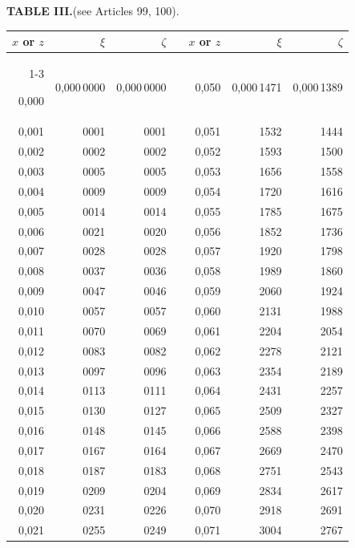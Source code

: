 \clearpage
{}
\begingroup
\centering
\fontsize{9}{9}\selectfont
\setlength{\tabcolsep}{8pt}
\renewcommand{\arraystretch}{1}
\setlength{\parskip}{0pt}
\textbf{TABLE III.}\quad (see Articles 99, 100).
\par\vspace{7pt}
\begin{tabular}{|r|r|r|@{}p{9pt}@{}|r|r|r|}
\hline
\rule{0pt}{8.5pt}\(x\) or \(z\) & \(\xi\) & \(\zeta\) & & \(x\) or \(z\) & \(\xi\) & \(\zeta\) \\
\cline{1-3}\cline{5-7}
\rule{0pt}{8.5pt}0,000 & 0,000\,0000 & 0,000\,0000 &  & 0,050 & 0,000\,1471 & 0,000\,1389 \\
0,001 & 0001 & 0001 &  & 0,051 & 1532 & 1444 \\
0,002 & 0002 & 0002 &  & 0,052 & 1593 & 1500 \\
0,003 & 0005 & 0005 &  & 0,053 & 1656 & 1558 \\
0,004 & 0009 & 0009 &  & 0,054 & 1720 & 1616 \\
0,005 & 0014 & 0014 &  & 0,055 & 1785 & 1675 \\[3pt]
0,006 & 0021 & 0020 &  & 0,056 & 1852 & 1736 \\
0,007 & 0028 & 0028 &  & 0,057 & 1920 & 1798 \\
0,008 & 0037 & 0036 &  & 0,058 & 1989 & 1860 \\
0,009 & 0047 & 0046 &  & 0,059 & 2060 & 1924 \\
0,010 & 0057 & 0057 &  & 0,060 & 2131 & 1988 \\[3pt]
0,011 & 0070 & 0069 &  & 0,061 & 2204 & 2054 \\
0,012 & 0083 & 0082 &  & 0,062 & 2278 & 2121 \\
0,013 & 0097 & 0096 &  & 0,063 & 2354 & 2189 \\
0,014 & 0113 & 0111 &  & 0,064 & 2431 & 2257 \\
0,015 & 0130 & 0127 &  & 0,065 & 2509 & 2327 \\[3pt]
0,016 & 0148 & 0145 &  & 0,066 & 2588 & 2398 \\
0,017 & 0167 & 0164 &  & 0,067 & 2669 & 2470 \\
0,018 & 0187 & 0183 &  & 0,068 & 2751 & 2543 \\
0,019 & 0209 & 0204 &  & 0,069 & 2834 & 2617 \\
0,020 & 0231 & 0226 &  & 0,070 & 2918 & 2691 \\[3pt]
0,021 & 0255 & 0249 &  & 0,071 & 3004 & 2767 \\

\end{tabular}
